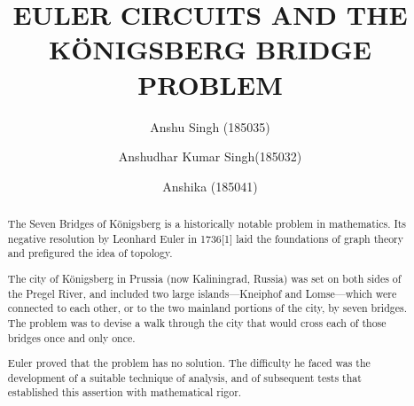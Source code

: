 \documentclass[acmsmall]{acmart}
\begin{document}
%
\title{EULER CIRCUITS AND THE  KÖNIGSBERG BRIDGE PROBLEM}

%
\author{Anshu Singh (185035)}


\author{Anshudhar Kumar Singh(185032)}

\author{Anshika (185041)}

%
\renewcommand{\shortauthors}{}

%
\begin{abstract}
The Seven Bridges of Königsberg is a historically notable problem in mathematics. Its negative resolution by Leonhard Euler in 1736[1] laid the foundations of graph theory and prefigured the idea of topology.

The city of Königsberg in Prussia (now Kaliningrad, Russia) was set on both sides of the Pregel River, and included two large islands—Kneiphof and Lomse—which were connected to each other, or to the two mainland portions of the city, by seven bridges. The problem was to devise a walk through the city that would cross each of those bridges once and only once.

Euler proved that the problem has no solution. The difficulty he faced was the development of a suitable technique of analysis, and of subsequent tests that established this assertion with mathematical rigor.
\end{abstract}

%
%
\end{document}
